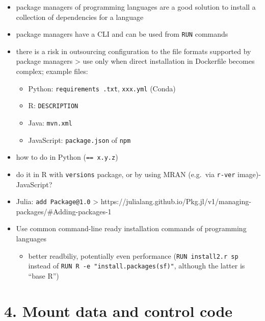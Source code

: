\documentclass[10pt,letterpaper]{article}
\providecommand{\tightlist}{%
  \setlength{\itemsep}{0pt}\setlength{\parskip}{0pt}}
\begin{document}
\begin{itemize}
\tightlist
\item
  package managers of programming languages are a good solution to
  install a collection of dependencies for a language
\item
  package managers have a CLI and can be used from \texttt{RUN} commands
\item
  there is a risk in outsourcing configuration to the file formats
  supported by package managers \textgreater{} use only when direct
  installation in Dockerfile becomes complex; example files:

  \begin{itemize}
  \tightlist
  \item
    Python: \texttt{requirements\ .txt}, \texttt{xxx.yml} (Conda)
  \item
    R: \texttt{DESCRIPTION}
  \item
    Java: \texttt{mvn.xml}
  \item
    JavaScript: \texttt{package.json} of \texttt{npm}
  \end{itemize}
\item
  how to do in Python (\texttt{==\ x.y.z})
\item
  do it in R with \texttt{versions} package, or by using MRAN (e.g.~via
  \texttt{r-ver} image)- JavaScript?
\item
  Julia: \texttt{add\ Package@1.0} \textgreater{}
  https://julialang.github.io/Pkg.jl/v1/managing-packages/\#Adding-packages-1
\item
  Use common command-line ready installation commands of programming
  languages

  \begin{itemize}
  \tightlist
  \item
    better readbiliy, potentially even performance
    (\texttt{RUN\ install2.r\ sp} instead of
    \texttt{RUN\ R\ -e\ "install.packages(\textquotesingle{}sf\textquotesingle{})"},
    although the latter is ``base R'')
  \end{itemize}
\end{itemize}

\hypertarget{mount-data-and-control-code}{%
\section*{4. Mount data and control
code}\label{mount-data-and-control-code}}
\end{document}
